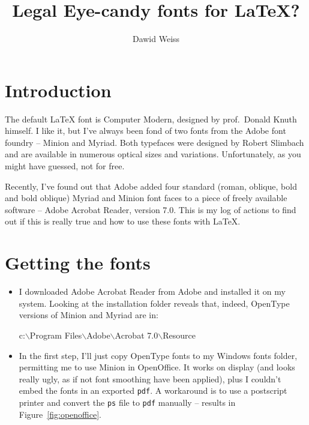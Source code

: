 \documentclass[10pt]{article}
\title{Legal Eye-candy fonts for \LaTeX{}?}
\author{Dawid Weiss}
\begin{document}
\maketitle%

\section{Introduction}

The default \LaTeX{} font is Computer Modern, designed by prof.~Donald Knuth himself. I like
it, but I've always been fond of two fonts from the Adobe font foundry -- Minion and Myriad.
Both typefaces were designed by Robert Slimbach and are available in numerous optical sizes
and variations. Unfortunately, as you might have guessed, not for free.

Recently, I've found out that Adobe added four standard (roman, oblique, bold and bold oblique)
Myriad and Minion font faces to a piece of freely available software -- 
Adobe Acrobat Reader, version 7.0. This is my log of actions to find out if this is really 
true and how to use these fonts with \LaTeX{}.

\section{Getting the fonts}

\begin{itemize}
    \item I downloaded Adobe Acrobat Reader from Adobe and installed it on my system. Looking
    at the installation folder reveals that, indeed, OpenType versions of
    Minion and Myriad are in:
    \begin{center}
    \textsf{c:$\backslash$Program Files$\backslash$Adobe$\backslash$Acrobat 7.0$\backslash$Resource}
    \end{center}
    
    \item In the first step, I'll just copy OpenType fonts to my Windows fonts folder,
    permitting me to use Minion in OpenOffice. It works on display (and looks really ugly, as if
    not font smoothing have been applied), plus I couldn't embed the fonts in an 
    exported \texttt{pdf}. A workaround is to use a postscript printer and convert
    the \texttt{ps} file to \texttt{pdf} manually -- results
    in Figure~\ref{fig:openoffice}.
\end{itemize}
\end{document}
